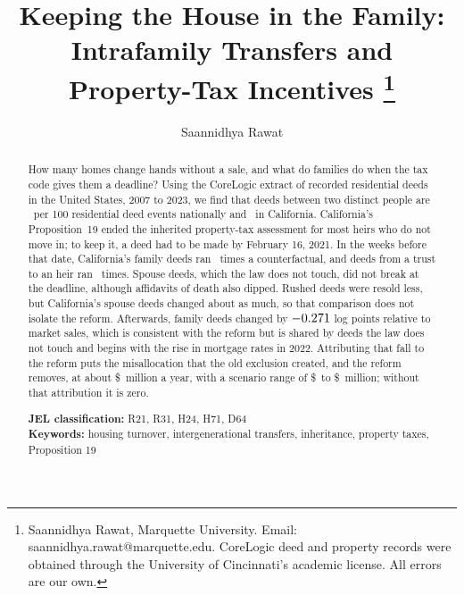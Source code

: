 \documentclass[12pt, letterpaper]{article}
\title{Keeping the House in the Family:\\ Intrafamily Transfers and Property-Tax Incentives
\thanks{Saannidhya Rawat, Marquette University. Email: saannidhya.rawat@marquette.edu. CoreLogic deed and property records were obtained through the University of Cincinnati's academic license.
All errors are our own.}}
\author{Saannidhya Rawat}
\begin{document}
\maketitle

\begingroup
\singlespacing
\vspace{-2em}
\begin{abstract}
\noindent How many homes change hands without a sale, and what do families do when the tax code gives them a deadline? Using the CoreLogic extract of recorded residential deeds in the United States, 2007 to 2023, we find that deeds between two distinct people are \DeedNationalShare\ per 100 residential deed events nationally and \DeedCAShare\ in California. California's Proposition~19 ended the inherited property-tax assessment for most heirs who do not move in; to keep it, a deed had to be made by February 16, 2021. In the weeks before that date, California's family deeds ran \SIVMainJanFeb\ times a counterfactual, and deeds from a trust to an heir ran \SIVHeirJanFeb\ times. Spouse deeds, which the law does not touch, did not break at the deadline, although affidavits of death also dipped. Rushed deeds were resold less, but California's spouse deeds changed about as much, so that comparison does not isolate the reform. Afterwards, family deeds changed by $-0.271$ log points relative to market sales, which is consistent with the reform but is shared by deeds the law does not touch and begins with the rise in mortgage rates in 2022. Attributing that fall to the reform puts the misallocation that the old exclusion created, and the reform removes, at about \$\WViLossCentral\ million a year, with a scenario range of \$\WViLossLow\ to \$\WViLossHigh\ million; without that attribution it is zero.

\par\smallskip
\textbf{JEL classification:} R21, R31, H24, H71, D64 \\
\textbf{Keywords:} housing turnover, intergenerational transfers, inheritance, property taxes, Proposition 19
\end{abstract}
\endgroup

\clearpage










\appendix

\end{document}
